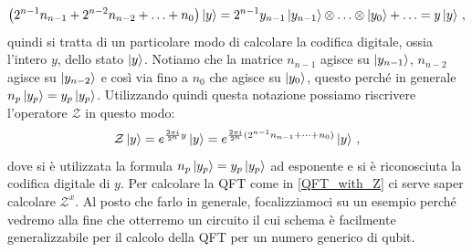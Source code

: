 \begin{equation*}
    \left( 2^{n-1} n_{n-1} + 2^{n-2} n_{n-2} + \ldots + n_0 \right) \ket y = 2^{n-1} y_{n-1} \ket{y_{n-1}} \otimes \ldots \otimes  \ket{y_0} + \ldots = y\ket y \, ,
\end{equation*}
quindi si tratta di un particolare modo di calcolare la codifica digitale, ossia l'intero $y$, dello stato $\ket{y}$. Notiamo che la matrice $n_{n-1}$ agisce su $\ket{y_{n-1}}$, $n_{n-2}$ agisce su $\ket{y_{n-2}}$ e così via fino a $n_0$ che agisce su $\ket{y_0}$,   questo perché in generale $n_p \ket{y_p} = y_p \ket{y_p}$. Utilizzando quindi questa notazione possiamo riscrivere l'operatore $\mathcal{Z}$ in questo modo: 
\begin{equation*}
    \mathcal{Z} \ket y = e^{\frac{2 \pi i}{2^n} y} \ket y = e^{\frac{2\pi i}{2^n} (2^{n-1}n_{n-1}+\dots+n_0)} \ket y \, ,
\end{equation*}
dove si è utilizzata la formula $n_p \ket{y_p} = y_p \ket{y_p}$ ad esponente e si è riconosciuta la codifica digitale di $y$. Per calcolare la QFT come in \eqref{QFT_with_Z} ci serve saper calcolare $\mathcal{Z}^x$. Al posto che farlo in generale, focalizziamoci su un esempio perché vedremo alla fine che otterremo un circuito il cui schema è facilmente generalizzabile per il calcolo della QFT per un numero generico di qubit.

